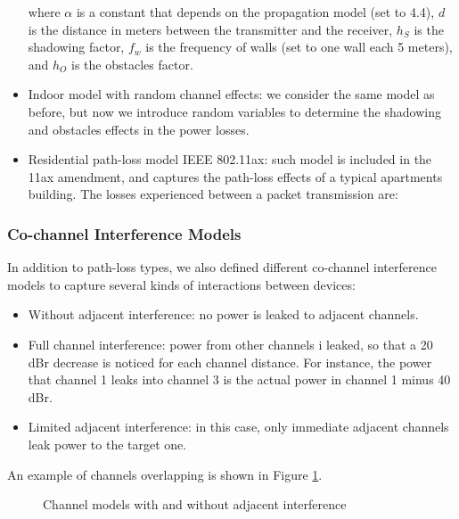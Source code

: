 \documentclass[a4paper]{article}
\begin{document}
\begin{itemize}
\begin{equation}
				\nonumber
			\end{equation}
			where $\alpha$ is a constant that depends on the propagation model (set to 4.4), $d$ is the distance in meters between the transmitter and the receiver, $h_S$ is the shadowing factor, $f_w$ is the frequency of walls (set to one wall each 5 meters), and $h_{O}$ is the obstacles factor.
			\item Indoor model with random channel effects: we consider the same model as before, but now we introduce random variables to determine the shadowing and obstacles effects in the power losses.
			\item Residential path-loss model IEEE 802.11ax: such model is included in the 11ax amendment, and captures the path-loss effects of a typical apartments building. The losses experienced between a packet transmission are:
			\begin{equation}
				\nonumber
			\end{equation}
		\end{itemize}
	
		\subsubsection{Co-channel Interference Models}
		In addition to path-loss types, we also defined different co-channel interference models to capture several kinds of interactions between devices:
		\begin{itemize}
			\item Without adjacent interference: no power is leaked to adjacent channels.
			\item Full channel interference: power from other channels i leaked, so that a 20 dBr decrease is noticed for each channel distance. For instance, the power that channel 1 leaks into channel 3 is the actual power in channel 1 minus 40 dBr. 
			\item Limited adjacent interference: in this case, only immediate adjacent channels leak power to the target one.
		\end{itemize}
		
		An example of channels overlapping is shown in Figure \ref{fig:cochannel_interference}.
		\begin{figure}[h!]
			\centering
			\caption{Channel models with and without adjacent interference}
			\label{fig:cochannel_interference}
		\end{figure}	
			
\end{document}
